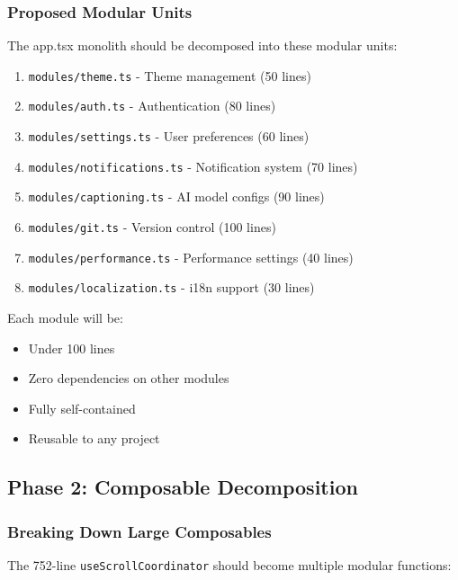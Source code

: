 \documentclass[11pt]{article}
\begin{document}
\subsubsection{Proposed Modular Units}

The app.tsx monolith should be decomposed into these modular units:

\begin{enumerate}
\item \texttt{modules/theme.ts} - Theme management (50 lines)
\item \texttt{modules/auth.ts} - Authentication (80 lines)
\item \texttt{modules/settings.ts} - User preferences (60 lines)
\item \texttt{modules/notifications.ts} - Notification system (70 lines)
\item \texttt{modules/captioning.ts} - AI model configs (90 lines)
\item \texttt{modules/git.ts} - Version control (100 lines)
\item \texttt{modules/performance.ts} - Performance settings (40 lines)
\item \texttt{modules/localization.ts} - i18n support (30 lines)
\end{enumerate}

Each module will be:
\begin{itemize}
\item Under 100 lines
\item Zero dependencies on other modules
\item Fully self-contained
\item Reusable to any project
\end{itemize}

\subsection{Phase 2: Composable Decomposition}

\subsubsection{Breaking Down Large Composables}

The 752-line \texttt{useScrollCoordinator} should become multiple modular functions:
\end{document}
